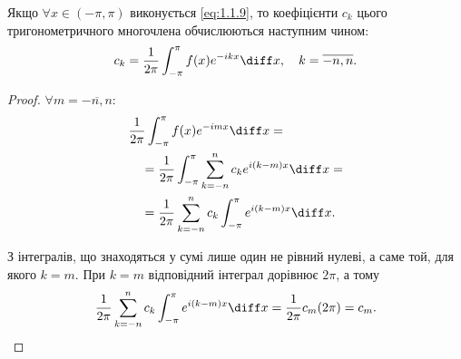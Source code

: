 \begin{theorem}
    Якщо $\forall x \in (-\pi, \pi)$ виконується \eqref{eq:1.1.9}, то коефіцієнти $c_k$ цього тригонометричного многочлена обчислюються наступним чином:
    \begin{equation}
        c_k = \frac{1}{2 \pi} \int_{-\pi}^{\pi} f(x) e^{-ikx} \diff x, \quad k = \overline{-n, n}.
    \end{equation}
\end{theorem}
\begin{proof}
    $\forall m = \overline{-n, n}$:
    \begin{equation}
        \begin{aligned}
            & \frac{1}{2 \pi} \int_{-\pi}^{\pi} f(x) e^{-imx} \diff x = \\
            &\quad = \frac{1}{2 \pi} \int_{-\pi}^{\pi} \sum_{k = -n}^n c_k e^{i(k-m)x} \diff x = \\
            &\quad = \frac{1}{2 \pi} \sum_{k = -n}^n c_k \int_{-\pi}^{\pi} e^{i(k-m)x} \diff x.
        \end{aligned}
    \end{equation}
    
    З інтегралів, що знаходяться у сумі лише один не рівний нулеві, а саме той, для якого $k = m$. При $k = m$ відповідний інтеграл дорівнює $2 \pi$, а тому
    \begin{equation}
        \frac{1}{2 \pi} \sum_{k = -n}^n c_k \int_{-\pi}^{\pi} e^{i(k-m)x} \diff x = \frac{1}{2 \pi} c_m (2 \pi) = c_m.
    \end{equation}
\end{proof}

